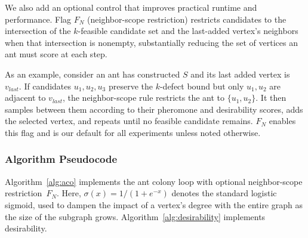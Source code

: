 \documentclass[conference]{IEEEtran}
\begin{document}
We also add an optional control that improves practical runtime and performance. Flag $F_N$ (neighbor-scope restriction) restricts candidates to the intersection of the $k$-feasible candidate set and the last-added vertex's neighbors when that intersection is nonempty, substantially reducing the set of vertices an ant must score at each step.


As an example, consider an ant has constructed $S$ and its last added vertex is $v_{last}$. If candidates $u_1,u_2,u_3$ preserve the $k$-defect bound but only $u_1,u_2$ are adjacent to $v_{last}$, the neighbor-scope rule restricts the ant to $\{u_1,u_2\}$. It then samples between them according to their pheromone and desirability scores, adds the selected vertex, and repeats until no feasible candidate remains. $F_N$ enables this flag and is our default for all experiments unless noted otherwise.


\subsubsection{Algorithm Pseudocode}


Algorithm~\ref{alg:aco} implements the ant colony loop with optional neighbor-scope restriction~$F_N$. Here, $\sigma(x) = 1/(1+e^{-x})$ denotes the standard logistic sigmoid, used to dampen the impact of a vertex's degree with the entire graph as the size of the subgraph grows. Algorithm~\ref{alg:desirability} implements desirability.
\end{document}
